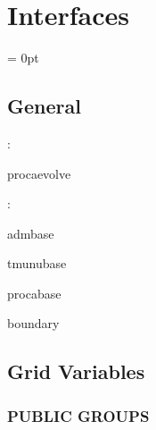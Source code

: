 
\section{Interfaces} 


\parskip = 0pt

\vspace{3mm} \subsection*{General}

: 

procaevolve
\vspace{2mm}

: 

admbase

tmunubase

procabase

boundary
\vspace{2mm}
\subsection*{Grid Variables}
\vspace{5mm}\subsubsection{PUBLIC GROUPS}

\vspace{5mm}


